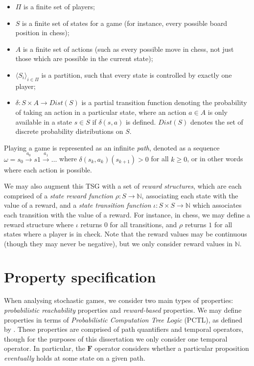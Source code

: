 \begin{itemize}
    \item $\Pi$ is a finite set of players;
    \item $S$ is a finite set of states for a game (for instance, every possible board position in chess);
    \item $A$ is a finite set of actions (such as every possible move in chess, not just those which are possible in the current state);
    \item $\langle S_i \rangle_{i \in \Pi}$ is a partition, such that every state is controlled by exactly one player;
    \item $\delta : S \times A \rightarrow Dist(S)$ is a partial transition function denoting the probability of taking an action in a particular state, where an action $a \in A$ is only available in a state $s \in S$ if $\delta(s, a)$ is defined. $Dist(S)$ denotes the set of discrete probability distributions on $S$.
\end{itemize}

Playing a game is represented as an infinite \emph{path}, denoted as a sequence $\omega = s_0 \xrightarrow{a_0} s1 \xrightarrow{a_1} \dots$ where $\delta(s_k, a_k)(s_{k+1})>0$ for all $k\geq0$, or in other words where each action is possible.

We may also augment this TSG with a set of \emph{reward structures}, which are each comprised of a \emph{state reward function} $\rho : S \rightarrow \mathbb{N}$, associating each state with the value of a reward, and a \emph{state transition function} $\iota : S \times S \rightarrow \mathbb{N}$ which associates each transition with the value of a reward. For instance, in chess, we may define a reward structure where $\iota$ returns $0$ for all transitions, and $\rho$ returns $1$ for all states where a player is in check. Note that the reward values may be continuous (though they may never be negative), but we only consider reward values in $\mathbb{N}$.

\section{Property specification}

When analysing stochastic games, we consider two main types of properties: \emph{probabilistic reachability} properties and \emph{reward-based} properties. We may define properties in terms of \emph{Probabilistic Computation Tree Logic} (PCTL), as defined by \cite{hansson_logic_1994}. These properties are comprised of path quantifiers and temporal operators, though for the purposes of this dissertation we only consider one temporal operator. In particular, the $\mathbf{F}$ operator considers whether a particular proposition \emph{eventually} holds at some state on a given path.

